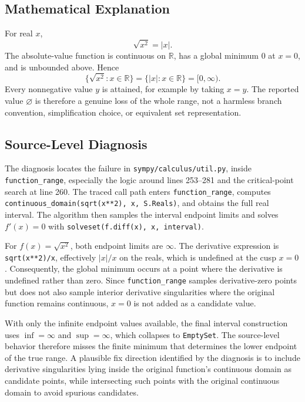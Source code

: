 \documentclass[11pt]{article}
\begin{document}
\subsection{Mathematical Explanation}

For real \(x\),
\[
  \sqrt{x^2} = |x|.
\]
The absolute-value function is continuous on \(\mathbb{R}\), has a global
minimum \(0\) at \(x=0\), and is unbounded above. Hence
\[
  \{\sqrt{x^2}: x \in \mathbb{R}\}
  =
  \{|x|: x \in \mathbb{R}\}
  =
  [0,\infty).
\]
Every nonnegative value \(y\) is attained, for example by taking \(x=y\). The
reported value \(\varnothing\) is therefore a genuine loss of the whole range,
not a harmless branch convention, simplification choice, or equivalent set
representation.

\subsection{Source-Level Diagnosis}

The diagnosis locates the failure in
\nolinkurl{sympy/calculus/util.py}, inside
\texttt{function\_range}, especially the logic around lines 253--281 and the
critical-point search at line 260. The traced call path enters
\texttt{function\_range}, computes
\texttt{continuous\_domain(sqrt(x**2), x, S.Reals)}, and obtains the full real
interval. The algorithm then samples the interval endpoint limits and solves
\(f'(x)=0\) with \texttt{solveset(f.diff(x), x, interval)}.

For \(f(x)=\sqrt{x^2}\), both endpoint limits are \(\infty\). The derivative
expression is \texttt{sqrt(x**2)/x}, effectively \(|x|/x\) on the reals, which
is undefined at the cusp \(x=0\). Consequently, the global minimum occurs at a
point where the derivative is undefined rather than zero. Since
\texttt{function\_range} samples derivative-zero points but does not also sample
interior derivative singularities where the original function remains
continuous, \(x=0\) is not added as a candidate value.

With only the infinite endpoint values available, the final interval
construction uses \(\inf=\infty\) and \(\sup=\infty\), which collapses to
\texttt{EmptySet}. The source-level behavior therefore misses the finite minimum
that determines the lower endpoint of the true range. A plausible fix direction
identified by the diagnosis is to include derivative singularities lying inside
the original function's continuous domain as candidate points, while intersecting
such points with the original continuous domain to avoid spurious candidates.
\end{document}
